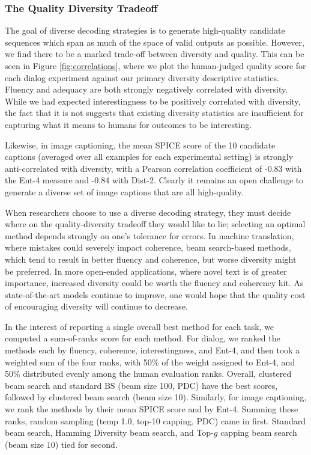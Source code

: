\subsubsection{The Quality Diversity Tradeoff}

The goal of diverse decoding strategies is to generate high-quality candidate sequences which span as much of the space of valid outputs as possible. 
However, we find there to be a marked trade-off between diversity and quality.
This can be seen in Figure \ref{fig:correlations}, where we plot the human-judged quality score for each dialog experiment against our primary diversity descriptive statistics.
Fluency and adequacy are both strongly negatively correlated with diversity.
While we had expected interestingness to be positively correlated with diversity, the fact that it is not suggests that existing diversity statistics are insufficient for capturing what it means to humans for outcomes to be interesting.

Likewise, in image captioning, the mean SPICE score of the 10 candidate captions (averaged over all examples for each experimental setting) is strongly anti-correlated with diversity, with a Pearson correlation coefficient of -0.83 with the Ent-4 measure and -0.84 with Dist-2.
Clearly it remains an open challenge to generate a diverse set of image captions that are all high-quality.

When researchers choose to use a diverse decoding strategy, they must decide where on the quality-diversity tradeoff they would like to lie; selecting an optimal method depends strongly on one's tolerance for errors.
In machine translation, where mistakes could severely impact coherence, beam search-based methods, which tend to result in better fluency and coherence, but worse diversity might be preferred.  
In more open-ended applications, where novel text is of greater importance, increased diversity could be worth the fluency and coherency hit.
As state-of-the-art models continue to improve, one would hope that the quality cost of encouraging diversity will continue to decrease. 

In the interest of reporting a single overall best method for each task, we computed a sum-of-ranks score for each method.
For dialog, we ranked the methods each by fluency, coherence, interestingness, and Ent-4, and then took a weighted sum of the four ranks, with 50\% of the weight assigned to Ent-4, and 50\% distributed evenly among the human evaluation ranks.
Overall, clustered beam search and standard BS (beam size 100, PDC) have the best scores, followed by clustered beam search (beam size 10).
Similarly, for image captioning, we rank the methods by their mean SPICE score and by Ent-4.
Summing these ranks, random sampling (temp 1.0, top-10 capping, PDC) came in first.
Standard beam search, Hamming Diversity beam search, and Top-$g$ capping beam search (beam size 10) tied for second.

